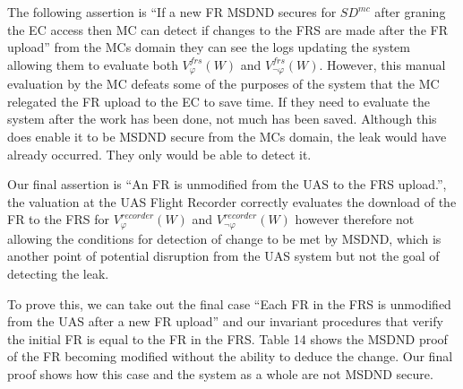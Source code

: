 \documentclass[10pt,journal,compsoc]{IEEEtran}
\begin{document}
The following assertion is ``If a new FR MSDND secures for $SD^{mc}$ after graning the EC access then MC can detect if changes to the FRS are made after the FR upload'' from the MCs domain they can see the logs updating the system allowing them to evaluate both $V^{frs}_{\varphi}(W)$ and $V^{frs}_{\lnot\varphi}(W)$. However, this manual evaluation by the MC defeats some of the purposes of the system that the MC relegated the FR upload to the EC to save time. If they need to evaluate the system after the work has been done, not much has been saved. Although this does enable it to be MSDND secure from the MCs domain, the leak would have already occurred. They only would be able to detect it.

Our final assertion is ``An FR is unmodified from the UAS to the FRS upload.'', the valuation at the UAS Flight Recorder correctly evaluates the download of the FR to the FRS for $V^{recorder}_{\varphi}(W)$ and $V^{recorder}_{\lnot\varphi}(W)$ however therefore not allowing the conditions for detection of change to be met by MSDND, which is another point of potential disruption from the UAS system but not the goal of detecting the leak. 

To prove this, we can take out the final case ``Each FR in the FRS is unmodified from the UAS after a new FR upload'' and our invariant procedures that verify the initial FR is equal to the FR in the FRS. Table 14 shows the MSDND proof of the FR becoming modified without the ability to deduce the change. Our final proof shows how this case and the system as a whole are not MSDND secure. 
\end{document}
